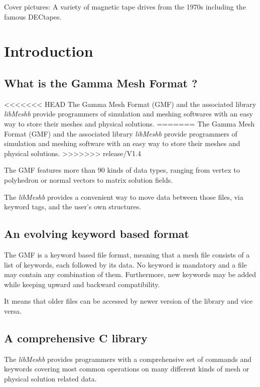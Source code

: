\documentclass[a4paper,12pt]{article}
\begin{document}
\footnotesize{Cover pictures: A variety of magnetic tape drives from the 1970s including the famous DECtapes.}
\normalsize

\clearpage


%
%

\section{Introduction}

\subsection{What is the Gamma Mesh Format ?}
<<<<<<< HEAD
The Gamma Mesh Format (GMF) and the associated library \emph{libMeshb} provide programmers of simulation and meshing softwares with an easy way to store their meshes and physical solutions.
=======
The Gamma Mesh Format (GMF) and the associated library \emph{libMeshb} provide programmers of simulation and meshing software with an easy way to store their meshes and physical solutions.
>>>>>>> release/V1.4

The GMF features more than 90 kinds of data types, ranging from vertex to polyhedron or normal vectors to matrix solution fields.

The \emph{libMeshb} provides a convenient way to move data between those files, via keyword tags, and the user's own structures.


\subsection{An evolving keyword based format}
The GMF is a keyword based file format, meaning that a mesh file consists of a list of keywords, each followed by its data. No keyword is mandatory and a file may contain any combination of them. Furthermore, new keywords may be added while keeping upward and backward compatibility.

It means that older files can be accessed by newer version of the library and vice versa.


\subsection{A comprehensive C library}
The \emph{libMeshb} provides programmers with a comprehensive set of commands and keywords covering most common operations on many different kinds of mesh or physical solution related data.
\end{document}
